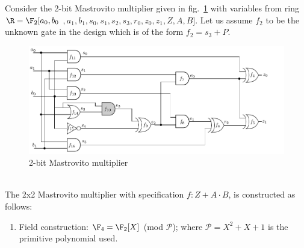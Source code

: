 \begin{Example}
Consider the 2-bit Mastrovito multiplier given in fig.~\ref{mas_c} with variables from ring $\R=\F_2[a_0,b_0$ $,a_1,b_1,s_0,s_1,s_2,s_3,r_0,z_0,z_1,Z,A,B]$. Let us assume $f_2$ to be the unknown gate in the design which is of the form $f_2 = s_3 + P$.\\%
\begin{figure}[ht]
	\begin{center}
	\includegraphics[scale = 0.65]{mas_c}
	\end{center}
	\vspace{-2ex}
	\caption{2-bit Mastrovito multiplier}
	\label{mas_c}
	\vspace{-1ex}
\end{figure}\\
The 2x2 Mastrovito multiplier with specification $f: Z + A\cdot B$, is constructed as follows:
\begin{enumerate}
    \item{Field construction: $\F_4 = \F_2[X]$ (mod $\mathcal{P}$); where $\mathcal{P} = X^2 + X + 1$ is the primitive polynomial used.}

\end{enumerate}
\end{Example}
